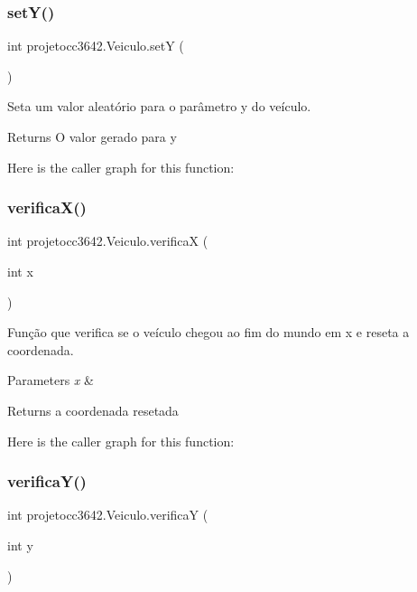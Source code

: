 \subsubsection{set\+Y()}
{\footnotesize\ttfamily int projetocc3642.\+Veiculo.\+setY (\begin{DoxyParamCaption}{ }\end{DoxyParamCaption})}



Seta um valor aleatório para o parâmetro y do veículo. 

\begin{DoxyReturn}{Returns}
O valor gerado para y 
\end{DoxyReturn}
Here is the caller graph for this function\+:
\mbox{\label{classprojetocc3642_1_1_veiculo_a3d9bb91a7f199cdd0c1b237c144a09c2}} 
\subsubsection{verifica\+X()}
{\footnotesize\ttfamily int projetocc3642.\+Veiculo.\+verificaX (\begin{DoxyParamCaption}\item[{int}]{x }\end{DoxyParamCaption})}



Função que verifica se o veículo chegou ao fim do mundo em x e reseta a coordenada. 


\begin{DoxyParams}{Parameters}
{\em x} & \\
\hline
\end{DoxyParams}
\begin{DoxyReturn}{Returns}
a coordenada resetada 
\end{DoxyReturn}
Here is the caller graph for this function\+:
\mbox{\label{classprojetocc3642_1_1_veiculo_afd6ec39ff0c4292505499065fd391d90}} 
\subsubsection{verifica\+Y()}
{\footnotesize\ttfamily int projetocc3642.\+Veiculo.\+verificaY (\begin{DoxyParamCaption}\item[{int}]{y }\end{DoxyParamCaption})}



